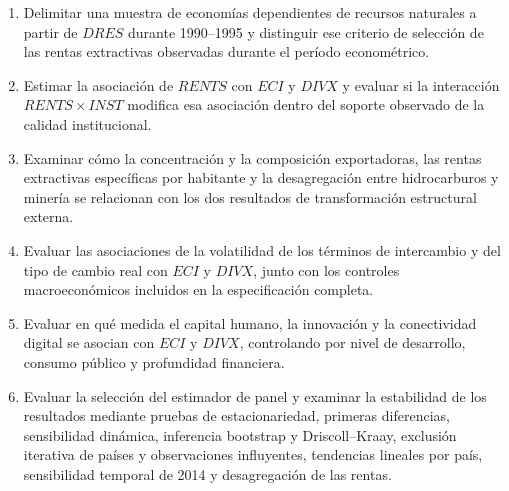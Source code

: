 \documentclass[../../TFM.tex]{subfiles}
\begin{document}
	\begin{enumerate}



		\item Delimitar una muestra de economías dependientes de recursos naturales
		a partir de $DRES$ durante 1990--1995 y distinguir ese criterio de selección
		de las rentas extractivas observadas durante el período econométrico.



		\item Estimar la asociación de $RENTS$ con $ECI$ y $DIVX$ y evaluar si la
		interacción $RENTS\times INST$ modifica esa asociación dentro del soporte
		observado de la calidad institucional.



		\item Examinar cómo la concentración y la composición exportadoras, las
		rentas extractivas específicas por habitante y la desagregación entre
		hidrocarburos y minería se relacionan con los dos resultados de
		transformación estructural externa.



		\item Evaluar las asociaciones de la volatilidad de los términos de
		intercambio y del tipo de cambio real con $ECI$ y $DIVX$, junto con los
		controles macroeconómicos incluidos en la especificación completa.



		\item Evaluar en qué medida el capital humano, la innovación y la
		conectividad digital se asocian con $ECI$ y $DIVX$, controlando por nivel de
		desarrollo, consumo público y profundidad financiera.



		\item Evaluar la selección del estimador de panel y examinar la estabilidad
		de los resultados mediante pruebas de estacionariedad, primeras diferencias,
		sensibilidad dinámica, inferencia bootstrap y Driscoll--Kraay, exclusión
		iterativa de países y observaciones influyentes, tendencias lineales por país,
		sensibilidad temporal de 2014 y desagregación de las rentas.



	\end{enumerate}



\end{document}
